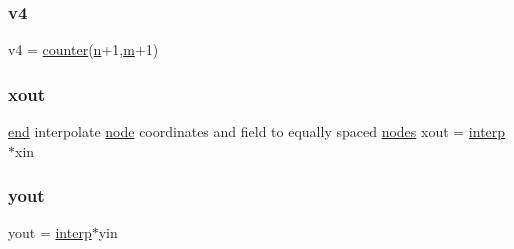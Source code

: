 \subsubsection{\texorpdfstring{v4}{v4}}
{\footnotesize\ttfamily v4 = \hyperlink{a00563_a22845a91f919051f5ce10e0fc468c821}{counter}(\hyperlink{a00623_a781a04ab095280f838ff3eb0e51312e0}{n}+1,\hyperlink{a00575_ab780b65adc28bca17f186bf3eebfb21d}{m}+1)}

\mbox{\label{a00563_aa43b7c30923e8fcf939fe12082a19359}} 
\subsubsection{\texorpdfstring{xout}{xout}}
{\footnotesize\ttfamily \hyperlink{a00608_afb358f48b1646c750fb9da6c6585be2b}{end} interpolate \hyperlink{a00611_adf51fe9945b6ca147057cc27ff639d0f}{node} coordinates and field to equally spaced \hyperlink{a00608_a9fd973fb7dcbed4123ae5eb2f3868e61}{nodes} xout = \hyperlink{a00563_a7626c967b638c3cc70c7c96863cbd07f}{interp}$\ast$xin}

\mbox{\label{a00563_a440aa7a05dec25dc6fe586eaa162395b}} 
\subsubsection{\texorpdfstring{yout}{yout}}
{\footnotesize\ttfamily yout = \hyperlink{a00563_a7626c967b638c3cc70c7c96863cbd07f}{interp}$\ast$yin}

